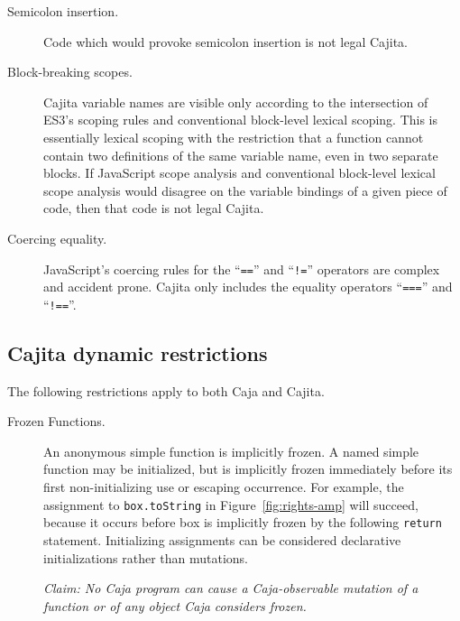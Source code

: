 \documentclass[letterpaper,twocolumn,10pt]{article}
\newcommand{\code}[1]{{\tt {#1}}}              %
\begin{document}
\begin{description}
    \item[Semicolon insertion.] Code which would provoke semicolon insertion 
    is not legal Cajita.
    
    \item[Block-breaking scopes.] Cajita variable names are visible only 
    according to the intersection of ES3's scoping rules and conventional 
    block-level lexical scoping. This is essentially lexical scoping with the 
    restriction that a function cannot contain two definitions of the same 
    variable name, even in two separate blocks. If JavaScript scope analysis 
    and conventional block-level lexical scope analysis would disagree on the 
    variable bindings of a given piece of code, then that code is not 
    legal Cajita.
    
    \item[Coercing equality.] JavaScript's coercing rules for the 
    ``\code{==}'' and ``\code{!=}'' operators are complex and accident prone. 
    Cajita only includes the equality operators ``\code{===}'' and 
    ``\code{!==}''.
        
\end{description}


\subsection{Cajita dynamic restrictions}

The following restrictions apply to both Caja and Cajita.

\begin{description}

  \item[Frozen Functions.] An anonymous simple function is implicitly frozen. 
  A named simple function may be initialized, but is implicitly frozen 
  immediately before its first non-initializing use or escaping occurrence. 
  For example, the assignment to \code{box.toString} in 
  Figure~\ref{fig:rights-amp} will succeed, because it occurs before box is 
  implicitly frozen by the following \code{return} statement. Initializing 
  assignments can be considered declarative initializations rather than 
  mutations.
  
  \emph{Claim: No Caja program can cause a Caja-observable mutation of a 
  function or of any object Caja considers frozen.}
  
\end{description}
\end{document}
